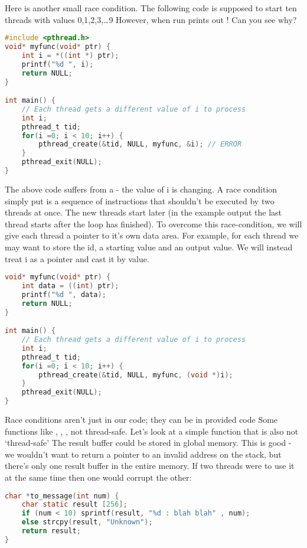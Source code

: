 Here is another small race condition.
The following code is supposed to start ten threads with values 0,1,2,3,\ldots{}9 However, when run prints out !
Can you see why?

\begin{lstlisting}[language=C]
#include <pthread.h>
void* myfunc(void* ptr) {
    int i = *((int *) ptr);
    printf("%d ", i);
    return NULL;
}

int main() {
    // Each thread gets a different value of i to process
    int i;
    pthread_t tid;
    for(i =0; i < 10; i++) {
        pthread_create(&tid, NULL, myfunc, &i); // ERROR
    }
    pthread_exit(NULL);
}
\end{lstlisting}

The above code suffers from a  - the value of i is changing.
A race condition simply put is a sequence of instructions that shouldn't be executed by two threads at once.
The new threads start later (in the example output the last thread starts after the loop has finished).
To overcome this race-condition, we will give each thread a pointer to it's own data area. For example, for each thread we may want to store the id, a starting value and an output value. We will instead treat i as a pointer and cast it by value.

\begin{lstlisting}[language=C]
void* myfunc(void* ptr) {
    int data = ((int) ptr);
    printf("%d ", data);
    return NULL;
}

int main() {
    // Each thread gets a different value of i to process
    int i;
    pthread_t tid;
    for(i =0; i < 10; i++) {
        pthread_create(&tid, NULL, myfunc, (void *)i);
    }
    pthread_exit(NULL);
}
\end{lstlisting}

Race conditions aren't just in our code; they can be in provided code
Some functions like , , ,  not thread-safe.
Let's look at a simple function that is also not `thread-safe' The result buffer could be stored in global memory.
This is good - we wouldn't want to return a pointer to an invalid address on the stack, but there's only one result buffer in the entire memory.
If two threads were to use it at the same time then one would corrupt the other:

\begin{lstlisting}[language=C]
char *to_message(int num) {
    char static result [256];
    if (num < 10) sprintf(result, "%d : blah blah" , num);
    else strcpy(result, "Unknown");
    return result;
}
\end{lstlisting}


